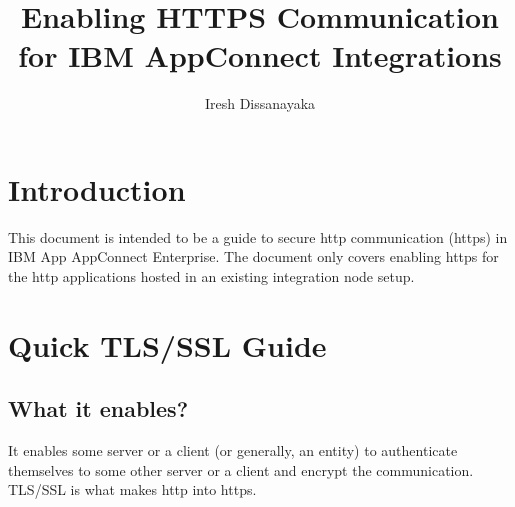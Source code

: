 \documentclass{article}
\author{Iresh Dissanayaka}
\title{Enabling HTTPS Communication for IBM AppConnect Integrations}
\begin{document}
    \maketitle

    \section{Introduction}
    This document is intended to be a guide to secure http communication
    (https) in IBM App AppConnect Enterprise. The document only covers
    enabling https for the http applications hosted in an existing
    integration node setup.

    \section{Quick TLS/SSL Guide}
    \subsection{What it enables?}
    It enables some server or a client (or generally, an entity) to
    authenticate themselves to some other server or a client and encrypt
    the communication. TLS/SSL is what makes http into https.
\end{document}
